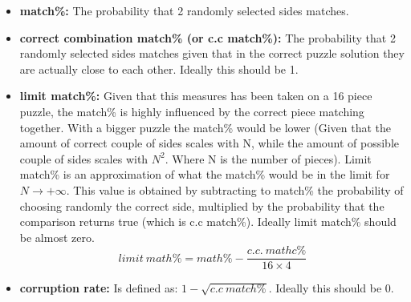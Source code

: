 \documentclass{article}
\begin{document}
\begin{itemize}
  \item \textbf{match\%:}\newline
  The probability that 2 randomly selected sides matches.
  
  \item \textbf{correct combination match\% (or c.c match\%):}\newline
  The probability that 2 randomly selected sides matches given that in the correct puzzle
  solution they are actually close to each other. Ideally this should be 1.
  
  \item \textbf{limit match\%:}\newline
  Given that this measures has been taken on a 16 piece puzzle,
  the match\% is highly influenced by the correct piece matching together.
  With a bigger puzzle the match\% would be lower (Given that the amount
  of correct couple of sides scales with N, while the amount of
  possible couple of sides scales with \(N^2\). Where N is the number of pieces).\newline
  Limit match\% is an approximation of what the match\%
  would be in the limit for \(N \rightarrow + \infty\).
  This value is obtained by subtracting to match\%
  the probability of choosing randomly the correct side,
  multiplied by the probability that the comparison returns true
  (which is c.c match\%). \newline
  Ideally limit match\% should be almost zero.
  \[limit \: math\% = math\% - \frac{c.c. \: mathc\%}{16 \times 4}\]
  
  \item \textbf{corruption rate:}\newline
  Is defined as: \(1-\sqrt{c.c \: match\%}\). Ideally this should be 0.

\end{itemize}
\end{document}
